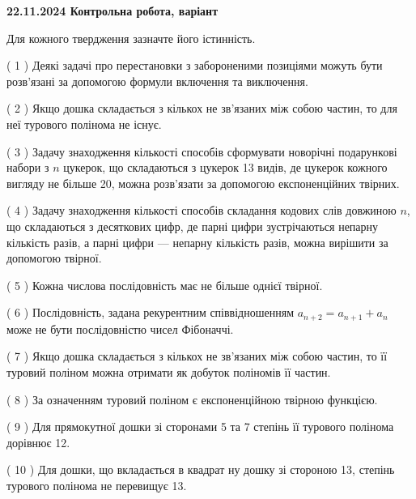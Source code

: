 \documentclass[12pt, ukrainian]{article}
\begin{document}
\vspace{4mm}
\newpage
\begin {large}

\textbf{22.11.2024 Контрольна робота, варіант  }\par


{
Для кожного твердження зазначте його істинність.\par
\vspace{2mm}
( 1 ) Деякі задачі про перестановки з забороненими позиціями можуть бути розв’я\-за\-ні за допомогою формули включення та виключення.%

( 2 ) Якщо дошка складається з кількох не зв’язаних між собою частин, то для неї турового полінома не існує.%

( 3 ) Задачу знаходження кількості способів сформувати новорічні подарункові набори з $n$ цукерок, що складаються з цукерок 13 видів, де цукерок кожного вигляду не більше 20, можна розв’язати за допомогою експоненційних твірних.%

( 4 ) Задачу знаходження кількості способів складання кодових слів довжиною $n$, що складаються з десяткових цифр, де парні цифри зустрічаються непарну кількість разів, а парні цифри — непарну кількість разів, можна вирішити за допомогою твірної.%

( 5 ) Кожна числова послідовність має не більше однієї твірної.%

( 6 ) Послідовність, задана рекурентним співвідношенням $a_{n+2}=a_{n+1}+a_{n}$ може не бути послідовністю чисел Фібоначчі.%

( 7 ) Якщо дошка складається з кількох не зв’язаних між собою частин, то її туровий поліном можна отримати як добуток поліномів її частин.%

( 8 ) За означенням туровий поліном є експоненційною твірною функцією.%

( 9 ) Для прямокутної дошки зі сторонами 5 та 7 степінь її турового полінома дорівнює 12.%

( 10 ) Для дошки, що вкладається в квадрат ну дошку зі стороною 13, степінь турового полінома не перевищує 13.%


\vspace{5mm}
}
\end {large}
\end{document}
